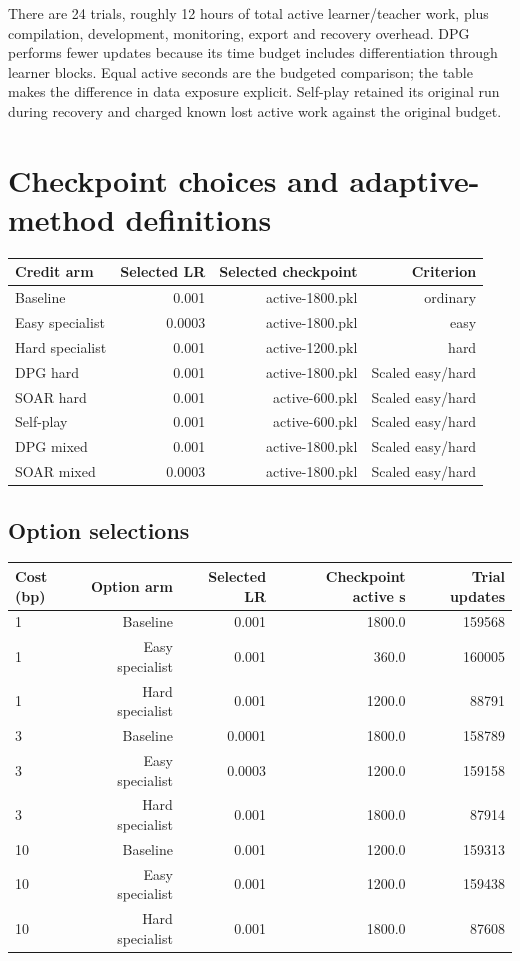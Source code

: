 \documentclass[11pt,a4paper]{article}
\begin{document}
There are 24 trials, roughly 12 hours of total active learner/teacher work, plus compilation, development, monitoring, export and recovery overhead. DPG performs fewer updates because its time budget includes differentiation through learner blocks. Equal active seconds are the budgeted comparison; the table makes the difference in data exposure explicit. Self-play retained its original run during recovery and charged known lost active work against the original budget.
\clearpage
\section{Checkpoint choices and adaptive-method definitions}
\begin{footnotesize}
\begin{tabular}{lrrr}
\toprule
Credit arm & Selected LR & Selected checkpoint & Criterion \\
\midrule
Baseline & 0.001 & active-1800.pkl & ordinary \\
Easy specialist & 0.0003 & active-1800.pkl & easy \\
Hard specialist & 0.001 & active-1200.pkl & hard \\
DPG hard & 0.001 & active-1800.pkl & Scaled easy/hard \\
SOAR hard & 0.001 & active-600.pkl & Scaled easy/hard \\
Self-play & 0.001 & active-600.pkl & Scaled easy/hard \\
DPG mixed & 0.001 & active-1800.pkl & Scaled easy/hard \\
SOAR mixed & 0.0003 & active-1800.pkl & Scaled easy/hard \\
\bottomrule
\end{tabular}
\end{footnotesize}\par\medskip

\subsection*{Option selections}
\begin{footnotesize}
\begin{tabular}{lrrrr}
\toprule
Cost (bp) & Option arm & Selected LR & Checkpoint active s & Trial updates \\
\midrule
1 & Baseline & 0.001 & 1800.0 & 159568 \\
1 & Easy specialist & 0.001 & 360.0 & 160005 \\
1 & Hard specialist & 0.001 & 1200.0 & 88791 \\
3 & Baseline & 0.0001 & 1800.0 & 158789 \\
3 & Easy specialist & 0.0003 & 1200.0 & 159158 \\
3 & Hard specialist & 0.001 & 1800.0 & 87914 \\
10 & Baseline & 0.001 & 1200.0 & 159313 \\
10 & Easy specialist & 0.001 & 1200.0 & 159438 \\
10 & Hard specialist & 0.001 & 1800.0 & 87608 \\
\bottomrule
\end{tabular}
\end{footnotesize}\par\medskip
\end{document}
